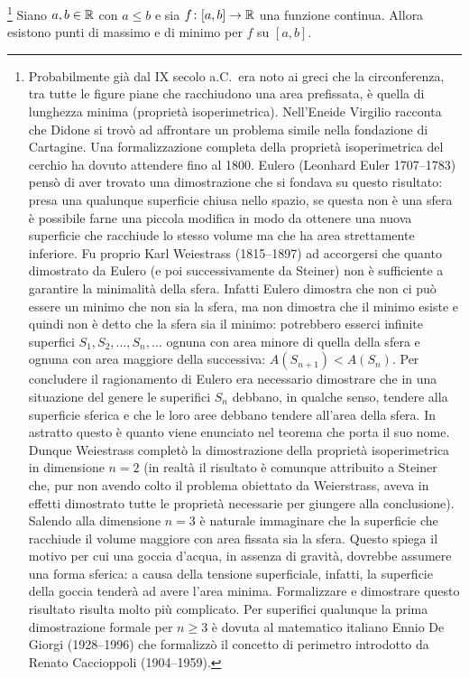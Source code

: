 \begin{theorem}[Weierstrass]%
\mymark{***}%
%
%
\footnote{%
Probabilmente già dal IX secolo a.C.\ era noto ai greci che la circonferenza, tra tutte le figure piane che racchiudono una area prefissata, 
è quella di lunghezza minima (proprietà isoperimetrica).
Nell'Eneide Virgilio racconta che Didone si trovò ad affrontare un problema 
simile nella fondazione di Cartagine.
%
%
%
Una formalizzazione completa della proprietà isoperimetrica del cerchio 
ha dovuto attendere fino al 1800.
Eulero (Leonhard Euler 1707--1783)
%
%
pensò di aver
trovato una dimostrazione
che si fondava su questo risultato:
presa una qualunque superficie chiusa nello spazio,
se questa non è una sfera è possibile
farne una piccola modifica in modo da ottenere una nuova superficie
che racchiude lo stesso volume ma che ha area strettamente inferiore.
Fu proprio Karl Weiestrass (1815--1897)
%
ad accorgersi che quanto dimostrato da Eulero (e poi successivamente da Steiner) 
non è sufficiente a garantire la minimalità della sfera. Infatti Eulero
dimostra che non ci può essere un minimo che non sia la sfera, ma non dimostra che il minimo esiste e quindi non è detto che la sfera sia il minimo: potrebbero esserci infinite superfici $S_1, S_2, \dots, S_n, \dots$ ognuna con area minore di quella della sfera e ognuna con area maggiore della successiva: $A(S_{n+1})< A(S_n)$. Per concludere il ragionamento di Eulero era necessario dimostrare che in una situazione del genere le superifici $S_n$ debbano, in qualche senso, tendere alla superficie sferica e che le loro aree debbano
tendere all'area della sfera. 
In astratto questo è quanto viene enunciato nel teorema che porta il suo nome.
Dunque Weiestrass completò la dimostrazione della proprietà isoperimetrica
in dimensione $n=2$ (in realtà il risultato è comunque attribuito a Steiner che,
pur non avendo colto il problema obiettato da Weierstrass, aveva in effetti 
dimostrato tutte le proprietà necessarie per giungere alla conclusione).
Salendo alla dimensione $n=3$ è naturale immaginare che 
la superficie che racchiude il volume maggiore con area fissata 
sia la sfera. 
Questo spiega il motivo per cui una goccia d'acqua, in assenza di gravità,
dovrebbe assumere una forma sferica: a causa della tensione superficiale, 
infatti, la superficie della goccia tenderà ad avere l'area minima.
Formalizzare e dimostrare questo risultato risulta molto più complicato.
Per superifici qualunque la prima dimostrazione formale per $n\ge 3$ 
è dovuta al matematico italiano Ennio De Giorgi (1928--1996)
%
che formalizzò il concetto di perimetro introdotto
da Renato Caccioppoli (1904--1959).%
%
%
}
Siano $a,b\in \mathbb R$ con $a\le b$
e sia $f\colon [a,b]\to \mathbb R$ una funzione continua.
Allora
esistono punti di massimo e di minimo per $f$ su $[a,b]$.
\end{theorem}
